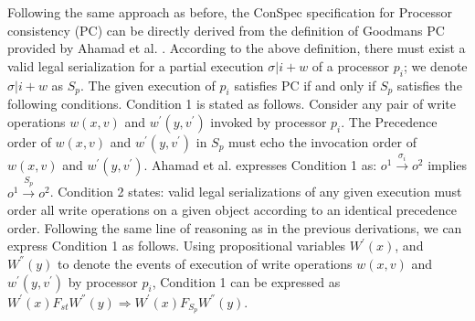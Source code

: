 \documentclass[journal,compsoc]{IEEEtran}
\begin{document}
 \par %
   Following the same approach as before, the ConSpec specification for Processor consistency (PC)  can be directly derived from the definition of Goodman\textquotesingle s PC provided by Ahamad et al. \cite{Ahamad:1993:PPC:165231.165264}.  
 According to the above definition, there must exist a valid legal serialization for a partial execution  $\sigma |i + w$ of 
 a processor $p_i$;  we denote  $\sigma |i + w$  as $S_p$.  The given execution of $p_i$ satisfies PC if and only if $S_p$ satisfies the following conditions.   
 Condition 1 is stated as follows. Consider any pair of write operations $w(x,v)$ and $w^{'}(y,v^{'})$ invoked by  processor $p_i$. The Precedence order of $w(x,v)$ and $w^{'}(y,v^{'})$  in $S_p$ must echo the invocation order of $w(x,v)$ and $w^{'}(y,v^{'})$.  Ahamad et al. expresses Condition 1 as:  
 $\mathit{o}^1 \xrightarrow{\sigma_i} \mathit{o}^2$ implies $\mathit{o}^1 \xrightarrow{S_p} \mathit{o}^2$. Condition 2 states:  valid legal serializations of any given execution must order all write operations on a given object according to an identical precedence order. %
  Following the same line of reasoning as in the previous derivations, we can express Condition 1 as follows.  Using propositional variables  $W^{'}(x) $, and $W^{''} (y) $ to denote the events of execution of write operations $w(x,v)$ and  $w^{'}(y,v^{'})$ by processor $p_i$, Condition 1 can be expressed as $W^{'}(x) F_\mathit{st}  W^{''} (y) \Rightarrow W^{'}(x) F_\mathit{S_p}  W^{''} (y) $. 
\end{document}
